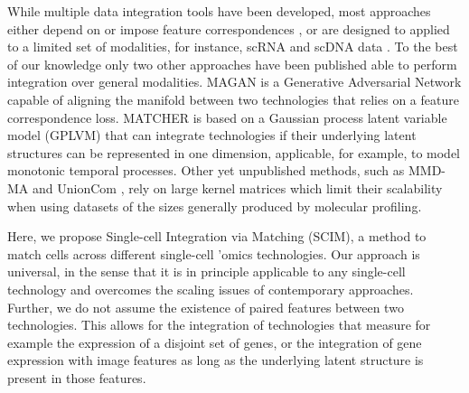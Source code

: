 While multiple data integration tools have been developed, most approaches either depend on or impose feature correspondences \cite{Stuart2019,Welch2019}, or are designed to applied to a limited set of modalities, for instance, scRNA and scDNA data \cite{Campbell2019,McCarthy2020}.
To the best of our knowledge only two other approaches have been published \cite{Amodio2018,Welch2017} able to perform integration over general modalities.
MAGAN \cite{Amodio2018} is a Generative Adversarial Network capable of aligning the manifold between two technologies that relies on a feature correspondence loss.
MATCHER \cite{Welch2017} is based on a Gaussian process latent variable model (GPLVM) \cite{Lawrence2004} that can integrate technologies if their underlying latent structures can be represented in one dimension, applicable, for example, to model monotonic temporal processes.
Other yet unpublished methods, such as MMD-MA \cite{Liu2019} and UnionCom \cite{Cao2020}, rely on large kernel matrices which limit their scalability when using datasets of the sizes generally produced by molecular profiling.

Here, we propose Single-cell Integration via Matching (SCIM), a method to match cells across different single-cell ’omics technologies.
Our approach is universal, in the sense that it is in principle applicable to any single-cell technology and overcomes the scaling issues of contemporary approaches.
Further, we do not assume the existence of paired features between two technologies.
This allows for the integration of technologies that measure for example the expression of a disjoint set of genes, or the integration of gene expression with image features as long as the underlying latent structure is present in those features.
